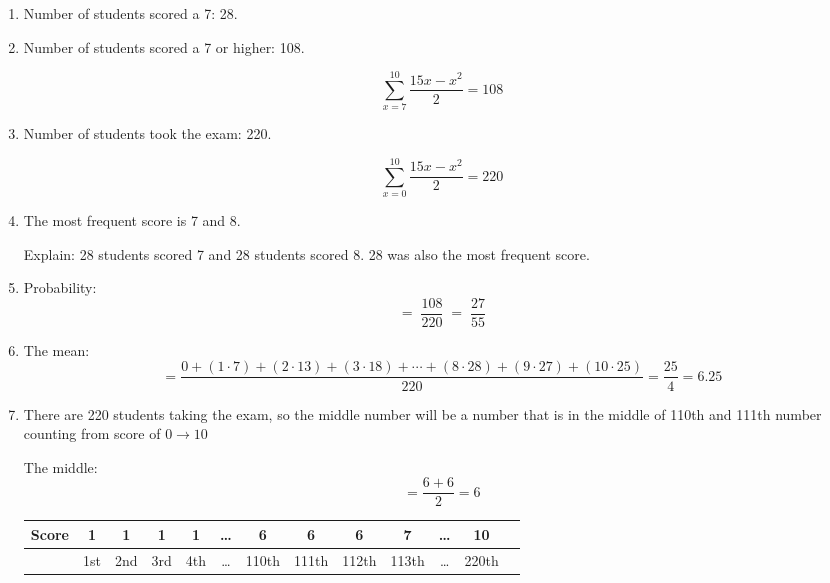 \documentclass[12pt]{article}
\begin{document}
    \begin{enumerate}
        \item Number of students scored a 7: 28.
        
        \item Number of students scored a 7 or higher: 108.\par
        $$\sum_{x=7}^{10}\frac{15x-x^2}{2}=108$$
        
        \item 
        Number of students took the exam: 220.\par
        $$\sum_{x=0}^{10}\frac{15x-x^2}{2}=220$$
            
        
        \item The most frequent score is 7 and 8. \par
        Explain: 28 students scored 7 and 28 students scored 8. 28 was also the most frequent score.
        

        \item Probability: $$=\;\frac{108}{220}\;=\;\frac{27}{55}$$
        
        \item The mean:
        $$=\frac{0+(1\cdot 7)+(2\cdot 13)+(3\cdot 18)+\cdots+(8\cdot 28)+(9\cdot 27)+(10\cdot 25)}{220}
        =\frac{25}{4}
        =6.25$$
        
        \item There are 220 students taking the exam, so the middle number will be a number that is in the middle of 110th and 111th number counting from score of $0 \to 10$\par
        The middle: $$=\frac{6+6}{2}=6$$
        
        \begin{center}
            \begin{tabular}{l |c|c|c|c|c|c|c|c|c|c|c| r}
                Score & 1 & 1 & 1 & 1 & \dots & 6 & 6 & 6 & 7 & \dots & 10 \\
                \hline
                &1st &2nd &3rd &4th &\dots &110th &111th &112th &113th &\dots &220th \\
            \end{tabular}
        \end{center}
        
    \end{enumerate}
    

\vspace{5cm}


%
\end{document}
